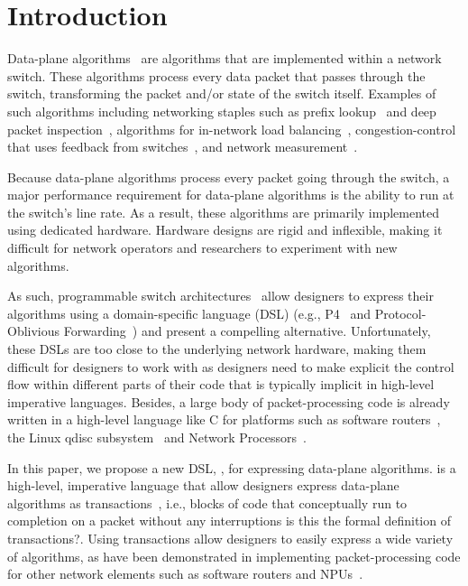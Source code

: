 \section{Introduction}
\label{s:intro}

Data-plane algorithms~\cite{cestan} are algorithms that are implemented within
a network switch. These algorithms process every data packet that passes
through the switch, transforming the packet and/or state of the switch itself.
Examples of such algorithms including networking staples such as prefix
lookup~\cite{lookup} and deep packet inspection~\cite{ids}, algorithms for
in-network load balancing~\cite{conga, ecmp}, congestion-control that uses
feedback from switches~\cite{xcp, rcp, pdq, dctcp}, and network
measurement~\cite{minsketch, heavy_hitters}.

Because data-plane algorithms process every packet going through the switch, a
major performance requirement for data-plane algorithms is the ability to run
at the switch's line rate. As a result, these algorithms are primarily implemented
using dedicated hardware. Hardware designs are rigid and inflexible, making it difficult
for network operators and researchers to experiment with new algorithms.

As such, programmable switch architectures~\cite{flexpipe, xpliant, rmt} allow
designers to express their algorithms using a domain-specific language (DSL)
(e.g., P4~\cite{p4} and Protocol-Oblivious Forwarding~\cite{pof}) and present
a compelling alternative.  Unfortunately, these DSLs are too close to the
underlying network hardware, making them difficult for designers to work with
as designers need to make explicit the control flow within different parts of
their code that is typically implicit in high-level imperative languages.
Besides, a large body of packet-processing code is already written in a
high-level language like C for platforms such as software routers~\cite{click},
the Linux qdisc subsystem~\cite{qdisc} and Network Processors~\cite{npu}.

In this paper, we propose a new DSL, \pktlanguage, for expressing 
data-plane algorithms. \pktlanguage
is a high-level, imperative language that allow 
designers express data-plane algorithms as transactions~\cite{transactions}, 
i.e., blocks of code that conceptually run to completion on a packet without any
interruptions \ac{is this the formal definition of transactions?}. Using 
transactions allow designers to easily express a wide variety of algorithms,
as have been demonstrated in implementing packet-processing code for 
other network elements such as software routers and NPUs~\cite{click, intel, qdisc}.

